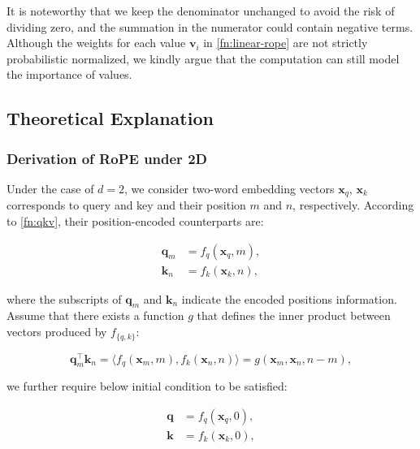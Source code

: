 It is noteworthy that we keep the denominator unchanged to avoid the risk of dividing zero, and the summation in the numerator could contain negative terms. Although the weights for each value ${\boldsymbol v}_i$ in  \ref{fn:linear-rope} are not strictly probabilistic normalized, we kindly argue that the computation can still model the importance of values. 
\subsection{Theoretical Explanation}
\subsubsection{Derivation of RoPE under 2D}\label{appendix:rope-deriv}
Under the case of $d=2$, we consider two-word embedding vectors ${\boldsymbol x}_q$, ${\boldsymbol x}_k$ corresponds to query and key and their position $m$ and $n$, respectively. According to \ref{fn:qkv}, their position-encoded counterparts are:

\begin{equation}
	\begin{aligned}
		{\boldsymbol q}_m &= f_q({\boldsymbol x}_q, m),  \\
		{\boldsymbol k}_n &= f_k({\boldsymbol x}_k, n),
	\end{aligned}
	\label{fn:deri-qk}
\end{equation}

where the subscripts of ${\boldsymbol q}_m$ and ${\boldsymbol k}_n$ indicate the encoded positions information. Assume that there exists a function $g$ that defines the inner product between vectors produced by $f_{\{q, k\}}$:

\begin{equation}
	{\boldsymbol q}^\intercal_m{\boldsymbol k}_n = \langle f_q({\boldsymbol x}_m, m),f_k({\boldsymbol x}_n, n)\rangle= g({\boldsymbol x}_m, {\boldsymbol x}_n, n - m),
	\label{fn:deri-g}
\end{equation}

we further require below initial condition to be satisfied:

\begin{equation}
	\begin{aligned}
		{\boldsymbol q} &= f_q({\boldsymbol x}_q, 0), \\
		{\boldsymbol k} &= f_k({\boldsymbol x}_k, 0), 
	\end{aligned}
	\label{fn:deri-initCond1}
\end{equation}

